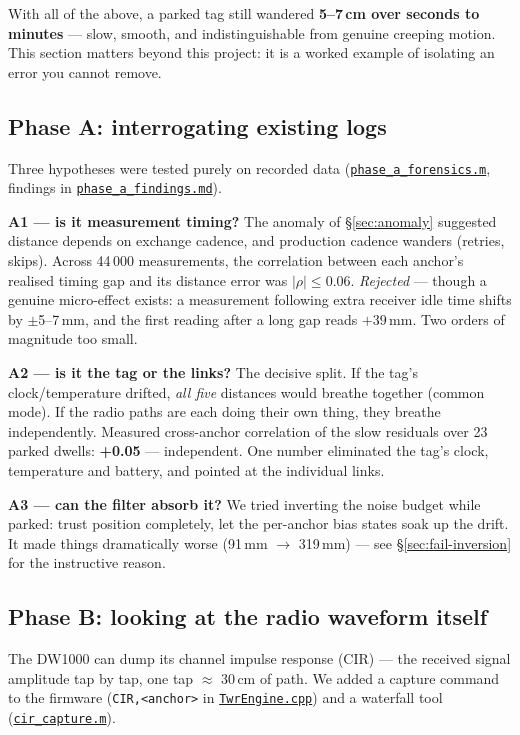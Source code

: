 \documentclass[11pt,a4paper]{article}
\newcommand{\gh}[2]{\href{https://github.com/AdershM-2/UWB_3/blob/main/#1}{\texttt{#2}}}
\newcommand{\code}[1]{\texttt{#1}}
\begin{document}
With all of the above, a parked tag still wandered \textbf{5--7\,cm over seconds to
minutes} --- slow, smooth, and indistinguishable from genuine creeping motion. This
section matters beyond this project: it is a worked example of isolating an error
you cannot remove.

\subsection{Phase A: interrogating existing logs}
\label{sec:phaseA}

Three hypotheses were tested purely on recorded data
(\gh{matlab/scripts/phase\_a\_forensics.m}{phase\_a\_forensics.m}, findings in
\gh{docs/phase\_a\_findings.md}{phase\_a\_findings.md}).

\textbf{A1 --- is it measurement timing?} The anomaly of \S\ref{sec:anomaly}
suggested distance depends on exchange cadence, and production cadence wanders
(retries, skips). Across 44\,000 measurements, the correlation between each
anchor's realised timing gap and its distance error was $|\rho| \le 0.06$.
\emph{Rejected} --- though a genuine micro-effect exists: a measurement following
extra receiver idle time shifts by $\pm$5--7\,mm, and the first reading after a
long gap reads $+39$\,mm. Two orders of magnitude too small.

\textbf{A2 --- is it the tag or the links?} The decisive split. If the tag's
clock/temperature drifted, \emph{all five} distances would breathe together
(common mode). If the radio paths are each doing their own thing, they breathe
independently. Measured cross-anchor correlation of the slow residuals over 23
parked dwells: \textbf{+0.05} --- independent. One number eliminated the tag's
clock, temperature and battery, and pointed at the individual links.

\textbf{A3 --- can the filter absorb it?} We tried inverting the noise budget while
parked: trust position completely, let the per-anchor bias states soak up the
drift. It made things dramatically worse (91\,mm $\to$ 319\,mm) --- see
\S\ref{sec:fail-inversion} for the instructive reason.

\subsection{Phase B: looking at the radio waveform itself}

The DW1000 can dump its channel impulse response (CIR) --- the received signal
amplitude tap by tap, one tap $\approx$ 30\,cm of path. We added a capture command
to the firmware (\code{CIR,<anchor>} in
\gh{libraries/UwbRtls/src/TwrEngine.cpp}{TwrEngine.cpp}) and a waterfall tool
(\gh{matlab/scripts/cir\_capture.m}{cir\_capture.m}).
\end{document}
